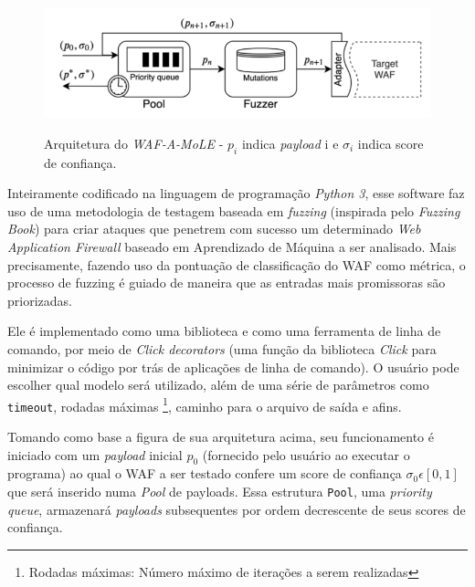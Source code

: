 \begin{figure}[ht]
    \centering
    \caption{Arquitetura do \textit{WAF-A-MoLE} - $p_i$ indica \textit{payload} i e $\sigma_i$  indica score de confiança.}
    \includegraphics[width=14cm]{figuras/wafamoleArchitecture.png} 
    \label{fig:internet} 
\end{figure}


Inteiramente codificado na linguagem de programação \textit{Python 3}, esse software faz uso de uma metodologia de testagem baseada em \textit{fuzzing} (inspirada pelo \textit{Fuzzing Book}) \cite{fuzzing_book} para criar ataques que penetrem com sucesso um determinado \textit{Web Application Firewall} baseado em Aprendizado de Máquina a ser analisado. Mais precisamente, fazendo uso da pontuação de classificação do WAF como métrica, o processo de fuzzing é guiado de maneira que as entradas mais promissoras são priorizadas.

Ele é implementado como uma biblioteca e como uma ferramenta de linha de comando, por meio de \textit{Click decorators} (uma função da biblioteca \textit{Click} para minimizar o código por trás de aplicações de linha de comando). O usuário pode escolher qual modelo será utilizado, além de uma série de parâmetros como \verb+timeout+, rodadas máximas \footnote{Rodadas máximas: Número máximo de iterações a serem realizadas}, caminho para o arquivo de saída e afins.

Tomando como base a figura de sua arquitetura acima, seu funcionamento é iniciado com um \textit{payload} inicial $p_0$ (fornecido pelo usuário ao executar o programa) ao qual o WAF a ser testado confere um score de confiança $\sigma_0 \epsilon [0, 1]$ que será inserido numa \textit{Pool} de payloads. Essa estrutura \verb+Pool+, uma \textit{priority queue}, armazenará \textit{payloads} subsequentes por ordem decrescente de seus scores de confiança.

